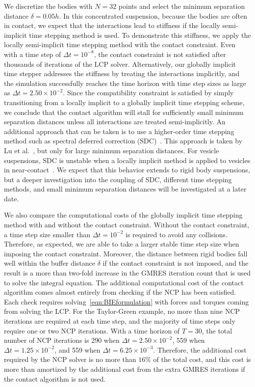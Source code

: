 \documentclass[AMA,STIX1COL]{WileyNJD-v2}
\begin{document}
We discretize the bodies with $N=32$ points and select the minimum
separation distance $\delta=0.05h$.   In this concentrated
suspension, because the bodies are often in contact, we expect that the
interactions lead to stiffness if the locally semi-implicit time
stepping method is used.  To demonstrate this stiffness, we apply the
locally semi-implicit time stepping method with the contact constraint.
Even with a time step of $\Delta t = 10^{-8}$, the contact constraint is
not satisfied after thousands of iterations of the LCP solver.
Alternatively, our globally implicit time stepper addresses the
stiffness by treating the interactions implicitly, and the simulation
successfully reaches the time horizon with time step sizes as large as
$\Delta t = 2.50 \times 10^{-2}$.  Since the compatibility constraint is
satisfied by simply transitioning from a locally implicit to a globally
implicit time stepping scheme, we conclude that the contact algorithm
will stall for sufficiently small minimum separation distances unless
all interactions are treated semi-implicitly.  An additional approach
that can be taken is to use a higher-order time stepping method such as
spectral deferred correction (SDC)~\cite{qua-bir2016}.  This approach is
taken by Lu et al.~\cite{Lu2017}, but only for large minimum separation
distances.  For vesicle suspensions, SDC is unstable when a locally
implicit method is applied to vesicles in
near-contact~\cite{qua-bir2016}. We expect that this behavior extends to
rigid body suspensions, but a deeper investigation into the coupling of
SDC, different time stepping methods, and small minimum separation
distances will be investigated at a later date.

We also compare the computational costs of the globally implicit time
stepping method with and without the contact constraint.  Without the
contact constraint, a time step size smaller than $\Delta t = 10^{-2}$
is required to avoid any collisions.  Therefore, as expected, we are
able to take a larger stable time step size when imposing the contact
constraint.  Moreover, the distance between rigid bodies fall well
within the buffer distance $\delta$ if the contact constraint is not
imposed, and the result is a more than two-fold increase in the GMRES
iteration count that is used to solve the integral equation.  The
additional computational cost of the contact algorithm comes almost
entirely from checking if the NCP has been satisfied.  Each check
requires solving~\eqref{eqn:BIEformulation} with forces and torques
coming from solving the LCP.  For the Taylor-Green example, no more than
nine NCP iterations are required at each time step, and the majority of
time steps only require one or two NCP iterations.  With a time horizon
of $T=30$, the total number of NCP iterations is 290 when $\Delta t =
2.50 \times 10^{-2}$, 559 when $\Delta t = 1.25 \times 10^{-2}$, and 559
when $\Delta t = 6.25 \times 10^{-3}$.  Therefore, the additional cost
required by the NCP solver is no more than $16\%$ of the total cost, and
this cost is more than amortized by the additional cost from the extra
GMRES iterations if the contact algorithm is not used.
\end{document}

